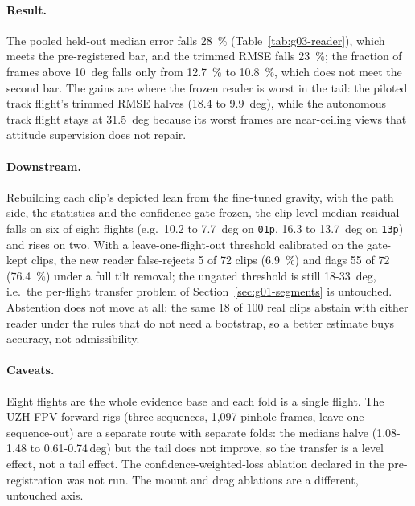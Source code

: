 \paragraph{Result.} The pooled held-out median error falls \SI{28}{\percent} (Table~\ref{tab:g03-reader}),
which meets the pre-registered bar, and the trimmed RMSE falls \SI{23}{\percent}; the fraction of
frames above \SI{10}{deg} falls only from \SI{12.7}{\percent} to \SI{10.8}{\percent}, which does
not meet the second bar. The gains are where the frozen reader is worst in the tail: the piloted
track flight's trimmed RMSE halves (\SI{18.4}{} to \SI{9.9}{deg}), while the autonomous track
flight stays at \SI{31.5}{deg} because its worst frames are near-ceiling views that attitude
supervision does not repair.

\paragraph{Downstream.} Rebuilding each clip's depicted lean from the fine-tuned gravity, with the
path side, the statistics and the confidence gate frozen, the clip-level median residual falls on
six of eight flights (e.g.\ \SI{10.2}{} to \SI{7.7}{deg} on \texttt{01p}, \SI{16.3}{} to
\SI{13.7}{deg} on \texttt{13p}) and rises on two. With a leave-one-flight-out threshold
calibrated on the gate-kept clips, the new reader false-rejects 5 of 72 clips (\SI{6.9}{\percent})
and flags 55 of 72 (\SI{76.4}{\percent}) under a full tilt removal; the ungated threshold is
still \SI{18}{}-\SI{33}{deg}, i.e.\ the per-flight transfer problem of
Section~\ref{sec:g01-segments} is untouched. Abstention does not move at all: the same 18 of 100
real clips abstain with either reader under the rules that do not need a bootstrap, so a better
estimate buys accuracy, not admissibility.

\paragraph{Caveats.} Eight flights are the whole evidence base and each fold is a single flight.
The UZH-FPV forward rigs (three sequences, 1,097 pinhole frames, leave-one-sequence-out) are a
separate route with separate folds: the medians halve (1.08-1.48 to 0.61-0.74\,deg) but the tail
does not improve, so the transfer is a level effect, not a tail effect. The confidence-weighted-loss ablation declared in the pre-registration
was not run. The mount and drag ablations are a different, untouched axis.
